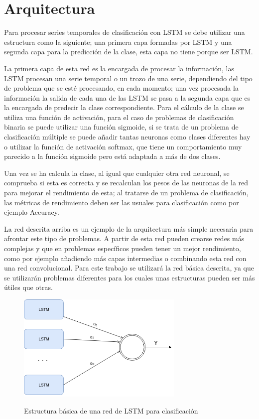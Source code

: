 \section{Arquitectura}
Para procesar series temporales de clasificación con LSTM se debe utilizar una estructura como la siguiente; una primera capa formadas por LSTM y una segunda capa para la predicción de la clase, esta capa no tiene porque ser LSTM.\newline

La primera capa de esta red es la encargada de procesar la información, las LSTM procesan una serie temporal o un trozo de una serie, dependiendo del tipo de problema que se esté procesando, en cada momento; una vez procesada la información la salida de cada una de las LSTM se pasa a la segunda capa que es la encargada de predecir la clase correspondiente. Para el cálculo de la clase se utiliza una función de activación, para el caso de problemas de clasificación binaria se puede utilizar una función sigmoide, si se trata de un problema de clasificación múltiple se puede añadir tantas neuronas como clases diferentes hay o utilizar la función de activación softmax, que tiene un comportamiento muy parecido a la función sigmoide pero está adaptada a más de dos clases.\newline

Una vez se ha calcula la clase, al igual que cualquier otra red neuronal,  se comprueba si esta es correcta y se recalculan los pesos de las neuronas de la red para mejorar el rendimiento de esta; al tratarse de un problema de clasificación, las métricas de rendimiento deben ser las usuales para clasificación como por ejemplo Accuracy.\newline

La red descrita arriba es un ejemplo de la arquitectura más simple necesaria para afrontar este tipo de problemas. A partir de esta red pueden crearse redes más complejas y que en problemas específicos pueden tener un mejor rendimiento, como por ejemplo añadiendo más capas intermedias o combinando esta red con una red convolucional.\newline
\newpage
Para este trabajo se utilizará la red básica descrita, ya que se utilizarán problemas diferentes para los cuales unas estructuras pueden ser más útiles que otras.

\begin{figure}[h]
	\centering
	\includegraphics[width=80mm]{imagenes/arquitectura_base.png}
	\label{fig:32}
	\caption{Estructura básica de una red de LSTM para clasificación}
\end{figure}
\verticalspace

